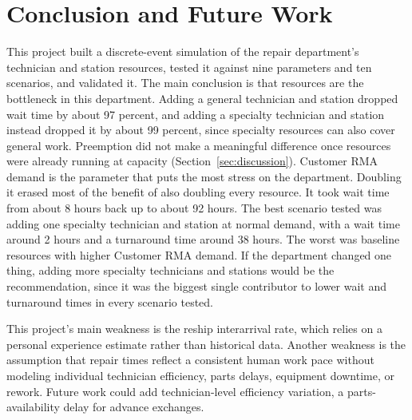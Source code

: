 \documentclass[12pt, letterpaper, twoside]{article}
\begin{document}
\section{Conclusion and Future Work}
\label{sec:conclusion}

This project built a discrete-event simulation of the repair department's technician and
station resources, tested it against nine parameters and ten scenarios, and validated it.
The main conclusion is that resources are the bottleneck in this
department. Adding a general technician and station dropped wait time by about 97
percent, and adding a specialty technician and station instead dropped it by about 99
percent, since specialty resources can also cover general work. Preemption did not make
a meaningful difference once resources were already running at capacity
(Section~\ref{sec:discussion}). Customer RMA demand is the parameter that puts the most
stress on the department. Doubling it erased most of the benefit of also doubling
every resource. It took wait time from about 8 hours back up to about 92 hours. The best
scenario tested was adding one specialty technician and station at normal demand, with
a wait time around 2 hours and a turnaround time around 38 hours. The worst was baseline
resources with higher Customer RMA demand. If the department changed one thing, adding
more specialty technicians and stations would be the recommendation, since it was the
biggest single contributor to lower wait and turnaround times in every scenario tested.

This project's main weakness is the reship interarrival rate, which relies on a
personal experience estimate rather than historical data. Another weakness is the assumption that repair
times reflect a consistent human work pace without modeling individual technician
efficiency, parts delays, equipment downtime, or rework. Future work could add
technician-level efficiency variation, a parts-availability delay for advance exchanges.




\end{document}
